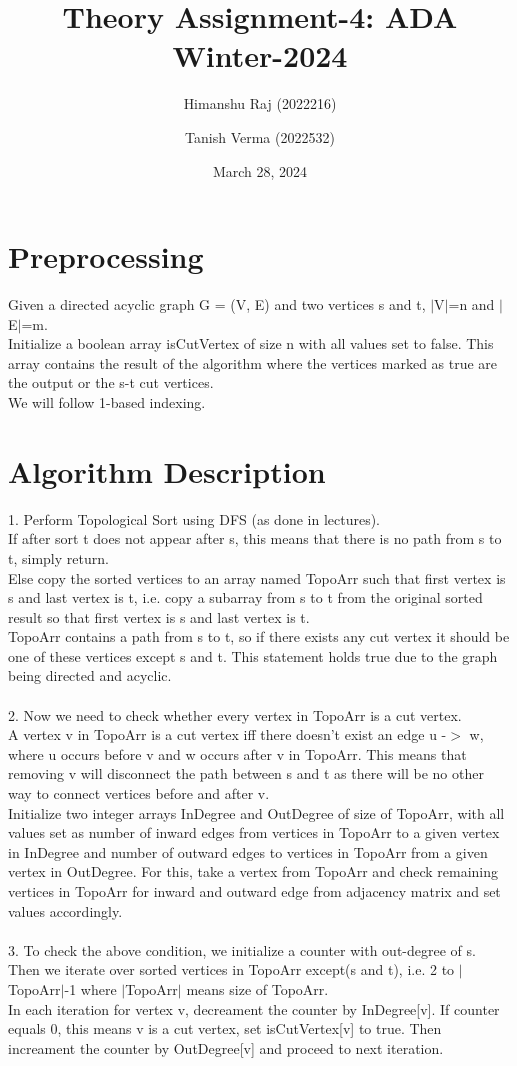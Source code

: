 \documentclass{article}
\title{Theory Assignment-4: ADA Winter-2024}
\author{Himanshu Raj (2022216) \and Tanish Verma (2022532)}
\date{March 28, 2024}
\begin{document}
\maketitle

\section{Preprocessing}
Given a directed acyclic graph G = (V, E) and two vertices s and t, $|$V$|$=n and $|$E$|$=m.
\\Initialize a boolean array isCutVertex of size n with all values set to false. This array contains the result of the algorithm where the vertices marked as true are the output or the s-t cut vertices.
\\We will follow 1-based indexing.


\section{Algorithm Description}
1. Perform Topological Sort using DFS (as done in lectures).
\\If after sort t does not appear after s, this means that there is no path from s to t, simply return.
\\Else copy the sorted vertices to an array named TopoArr such that first vertex is s and last vertex is t, i.e. copy a subarray from s to t from the original sorted result so that first vertex is s and last vertex is t.
\\TopoArr contains a path from s to t, so if there exists any cut vertex it should be one of these vertices except s and t. This statement holds true due to the graph being directed and acyclic.\\
\\
2. Now we need to check whether every vertex in TopoArr is a cut vertex.
\\A vertex v in TopoArr is a cut vertex iff there doesn't exist an edge u -$>$ w, where u occurs before v and w occurs after v in TopoArr. This means that removing v will disconnect the path between s and t as there will be no other way to connect vertices before and after v.\\
Initialize two integer arrays InDegree and OutDegree of size of TopoArr, with all values set as number of inward edges from vertices in TopoArr to a given vertex in InDegree and number of outward edges to vertices in TopoArr from a given vertex in OutDegree. For this, take a vertex from TopoArr and check remaining vertices in TopoArr for inward and outward edge from adjacency matrix and set values accordingly.\\
\\
3. To check the above condition, we initialize a counter with out-degree of s.
\\Then we iterate over sorted vertices in TopoArr except(s and t), i.e. 2 to $|$TopoArr$|$-1 where $|$TopoArr$|$ means size of TopoArr.
\\In each iteration for vertex v, decreament the counter by InDegree[v]. If counter equals 0, this means v is a cut vertex, set isCutVertex[v] to true. Then increament the counter by OutDegree[v] and proceed to next iteration.
\end{document}
